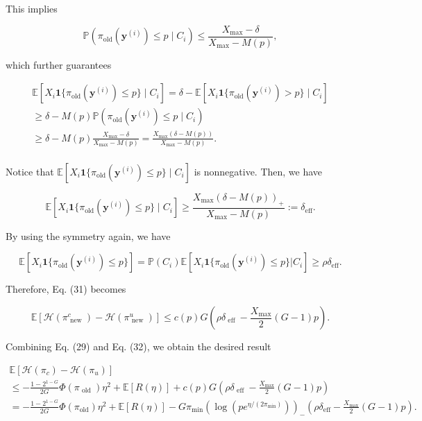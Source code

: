 \documentclass[
  10
]{article}
\begin{document}
This implies

\[
\mathbb {P} (\pi_ {\mathrm{old}} (\mathbf {y} ^ {(i)}) \leq p \mid C _ {i}) \leq \frac {X _ {\max} - \delta}{X _ {\max} - M (p)},
\]

which further guarantees

\[
\begin{array}{l} \mathbb {E} [ X _ {i} \mathbf {1} \{\pi_ {\mathrm{old}} (\mathbf {y} ^ {(i)}) \leq p \} \mid C _ {i} ] = \delta - \mathbb {E} [ X _ {i} \mathbf {1} \{\pi_ {\mathrm{old}} (\mathbf {y} ^ {(i)}) > p \} \mid C _ {i} ] \\ \geq \delta - M (p) \mathbb {P} (\pi_ {\mathrm{old}} (\mathbf {y} ^ {(i)}) \leq p \mid C _ {i}) \\ {\geq} {\delta - M (p) \frac {X _ {\max} - \delta}{X _ {\max} - M (p)} = \frac {X _ {\max} (\delta - M (p))}{X _ {\max} - M (p)}.} \\ \end{array}
\]

Notice that
\(\mathbb { E } [ X _ { i } \mathbf { 1 } \{ \pi _ { \mathrm { o l d } } ( \mathbf { y } ^ { ( i ) } ) \leq p \} \mid C _ { i } ]\)
is nonnegative. Then, we have

\[
\mathbb {E} [ X _ {i} \mathbf {1} \{\pi_ {\mathrm{old}} (\mathbf {y} ^ {(i)}) \leq p \} \mid C _ {i} ] \geq \frac {X _ {\max} (\delta - M (p)) _ {+}}{X _ {\max} - M (p)} := \delta_ {\mathrm{eff}}.
\]

By using the symmetry again, we have

\[
\mathbb {E} [ X _ {i} \mathbf {1} \{\pi_ {\mathrm{old}} (\mathbf {y} ^ {(i)}) \leq p \} ] = \mathbb {P} (C _ {i}) \mathbb {E} [ X _ {i} \mathbf {1} \{\pi_ {\mathrm{old}} (\mathbf {y} ^ {(i)}) \leq p \} | C _ {i} ] \geq \rho \delta_ {\mathrm{eff}}.
\]

Therefore, Eq. (31) becomes

\[
\mathbb {E} \left[ \mathcal {H} \left(\pi_ {\text { new }} ^ {c}\right) - \mathcal {H} \left(\pi_ {\text { new }} ^ {u}\right) \right] \leq c (p) G \left(\rho \delta_ {\text { eff }} - \frac {X _ {\max}}{2} (G - 1) p\right). \tag {32}
\]

Combining Eq. (29) and Eq. (32), we obtain the desired result

\[
\begin{array}{l} \mathbb {E} \left[ \mathcal {H} \left(\pi_ {c}\right) - \mathcal {H} \left(\pi_ {u}\right) \right] \\ \leq - \frac {1 - 2 ^ {1 - G}}{2 G} \Phi (\pi_ {\text { old }}) \eta^ {2} + \mathbb {E} [ R (\eta) ] + c (p) G \left(\rho \delta_ {\text { eff }} - \frac {X _ {\max}}{2} (G - 1) p\right) \\ = - \frac {1 - 2 ^ {1 - G}}{2 G} \Phi \left(\pi_ {\text {old}}\right) \eta^ {2} + \mathbb {E} [ R (\eta) ] - G \pi_ {\min} \left(\log \left(p e ^ {\eta / \left(2 \pi_ {\min}\right)}\right)\right) _ {-} \left(\rho \delta_ {\text {eff}} - \frac {X _ {\max}}{2} (G - 1) p\right). \tag {33} \\ \end{array}
\]
\end{document}
